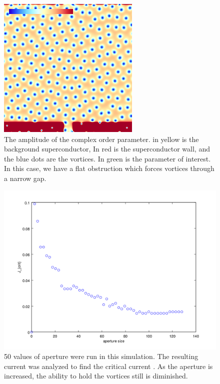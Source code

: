 \begin{figure}[htbp]
\begin{center}
\includegraphics[scale=.50]{ratchetNoAngle.png}
\caption{ The amplitude of the complex order parameter. in yellow is the background superconductor, In red is the superconductor wall, and the blue dots are the vortices. In green is the parameter of interest. In this case, we have a flat obstruction which forces vortices through a narrow gap.}
\label{noAngle}
\end{center}
\end{figure} 

\begin{figure}[htbp]
\begin{center}
\includegraphics[scale=.50]{flatScan.png}
\caption{ 50 values of aperture were run in this simulation. The resulting current was analyzed to find the critical current . As the aperture is increased, the ability to hold the vortices still is diminished. }
\label{flatScan}
\end{center}
\end{figure}


